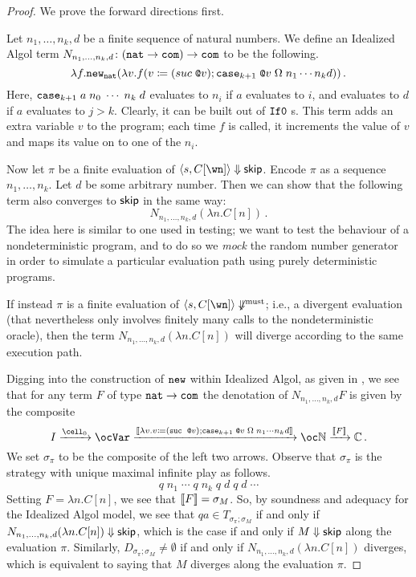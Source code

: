 \documentclass[sigplan,10pt,review]{acmart}\settopmatter{printfolios=true,printccs=false,printacmref=false}
\begin{document}
\begin{proof}
  We prove the forward directions first.

  Let $n_1,\dots,n_k,d$ be a finite sequence of natural numbers.  
  We define an Idealized Algol term $N_{n_1,\dots,n_k,d}\colon ({\mathtt{nat}} \to {\mathtt{com}}) \to {\mathtt{com}}$ to be the following.
  \[
    \lambda f.{\mathtt{new}}_{\mathtt{nat}} (\lambda v.f(v\coloneqq (suc\;\texttt{@} v); {\mathtt{case}}_{k+1}\;\texttt{@} v\;\Omega\;n_1 \cdots n_k d))\,.
    \]
  Here, ${\mathtt{case}}_{k+1}\;a\;n_0\;\cdots\;n_k\;d$ evaluates to $n_i$ if $a$ evaluates to $i$, and evaluates to $d$ if $a$ evaluates to $j> k$.
  Clearly, it can be built out of ${\mathtt{If0}\;}$s.
  This term adds an extra variable $v$ to the program; each time $f$ is called, it increments the value of $v$ and maps its value on to one of the $n_i$.  

  Now let $\pi$ be a finite evaluation of $\ia s {C[\wn]} \converges\skipp$.  
  Encode $\pi$ as a sequence $n_1,\dots,n_k$.  
  Let $d$ be some arbitrary number.
  Then we can show that the following term also converges to ${\mathsf{skip}}$ in the same way:
  \[
    N_{n_1,\dots,n_k,d} (\lambda n.C[n])\,.
    \]
  The idea here is similar to one used in testing; we want to test the behaviour of a nondeterministic program, and to do so we \emph{mock} the random number generator in order to simulate a particular evaluation path using purely deterministic programs.  

  If instead $\pi$ is a finite evaluation of $\ia s {C[\wn]}\not\mustconverge$; i.e., a divergent evaluation (that nevertheless only involves finitely many calls to the nondeterministic oracle), then the term $N_{n_1,\dots,n_k,d} (\lambda n.C[n])$ will diverge according to the same execution path.

  Digging into the construction of ${\mathtt{new}}$ within Idealized Algol, as given in \cite{SamsonGuyIAPassive}, we see that for any term $F$ of type ${\mathtt{nat}}\to{\mathtt{com}}$ the denotation of $N_{n_1,\dots,n_k,d} F$ is given by the composite
  \[
    I \xrightarrow{\cell_{0}}
    \oc \Var \xrightarrow{\deno{\lambda v.v\coloneqq (\suc\;\deref v);\case_{k+1}\;\deref v\;\Omega\;n_1\cdots n_k d}}
    \oc\bN \xrightarrow{\deno F}
    \bC\,.
    \]
  We set $\sigma_\pi$ to be the composite of the left two arrows.  
  Observe that $\sigma_\pi$ is the strategy with unique maximal infinite play as follows.
  \[
    q\;n_1\;\cdots\;q\;n_k\;q\;d\;q\;d\;\cdots
    \]
  Setting $F = \lambda n.C[n]$, we see that $\left\llbracket F\right\rrbracket=\sigma_M$.  
  So, by soundness and adequacy for the Idealized Algol model, we see that $qa\in T_{\sigma_\pi;\sigma_M}$ if and only if $N_{n_1,\dots,n_k,d} (\lambda n.C[n])\Downarrow{\mathsf{skip}}$, which is the case if and only if $M\Downarrow{\mathsf{skip}}$ along the evaluation $\pi$.
  Similarly, $D_{\sigma_\pi;\sigma_M}\neq\emptyset$ if and only if $N_{n_1,\dots,n_k,d}(\lambda n.C[n])$ diverges, which is equivalent to saying that $M$ diverges along the evaluation $\pi$.


\end{proof}
\end{document}
